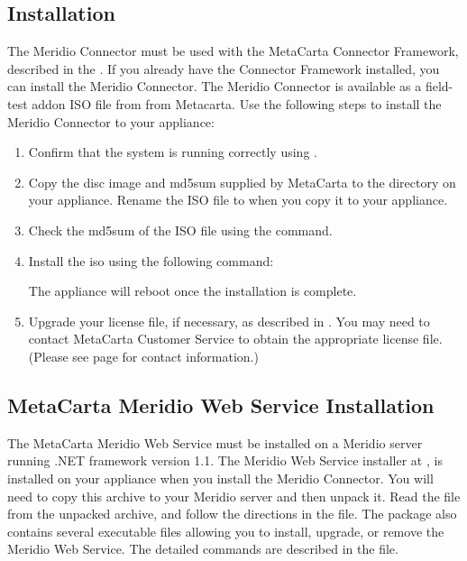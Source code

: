 \begin{changemargin}{1.5in}{0in}
\section{Installation}

The Meridio Connector must be used with the MetaCarta Connector
Framework, described in the . If you already have the Connector Framework installed, you can
install the Meridio Connector.  The Meridio Connector is
available as a field-test addon ISO file from from Metacarta. Use the
following steps to install the Meridio Connector to your appliance:

\begin{enumerate}

\item Confirm that the system is running correctly using
.

\item Copy the disc image and md5sum supplied by MetaCarta to the
 directory on your appliance. Rename the ISO file to
 when you copy it to your appliance.

\item Check the md5sum of the ISO file using the  command.

\item Install the iso using the following command:


The appliance will reboot once the installation is complete.

\item Upgrade your license file, if necessary, as described in
. You may need
to contact MetaCarta Customer Service to obtain the appropriate
license file. (Please see page \pageref{SupportContact} for contact
information.)
 
\end{enumerate}


\subsection{MetaCarta Meridio Web Service Installation}\label{SWService}

The MetaCarta Meridio Web Service must be installed on a Meridio
server running .NET framework version 1.1. The
Meridio Web Service installer at  
\linebreak{},
is installed on your appliance when you install the Meridio Connector.
You will need to copy this archive to your Meridio
server and then unpack it. Read the file  from the
unpacked archive, and follow the directions in the file. The package
also contains several executable files allowing you to install,
upgrade, or remove the Meridio Web Service. The detailed commands are
described in the  file.


\end{changemargin}
